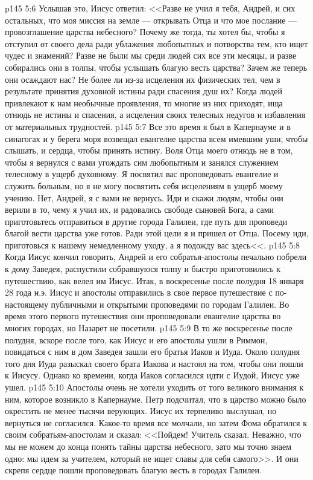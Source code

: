 \vs p145 5:6 Услышав это, Иисус ответил: <<Разве не учил я тебя, Андрей, и сих остальных, что моя миссия на земле --- открывать Отца и что мое послание --- провозглашение царства небесного? Почему же тогда, ты хотел бы, чтобы я отступил от своего дела ради ублажения любопытных и потворства тем, кто ищет чудес и знамений? Разве не были мы среди людей сих все эти месяцы, и разве собирались они в толпы, чтобы услышать благую весть царства? Зачем же теперь они осаждают нас? Не более ли из\hyp{}за исцеления их физических тел, чем в результате принятия духовной истины ради спасения душ их? Когда людей привлекают к нам необычные проявления, то многие из них приходят, ища отнюдь не истины и спасения, а исцеления своих телесных недугов и избавления от материальных трудностей.
\vs p145 5:7 Все это время я был в Капернауме и в синагогах и у берега моря возвещал евангелие царства всем имевшим уши, чтобы слышать, и сердца, чтобы принять истину. Воля Отца моего отнюдь не в том, чтобы я вернулся с вами угождать сим любопытным и занялся служением телесному в ущерб духовному. Я посвятил вас проповедовать евангелие и служить больным, но я не могу посвятить себя исцелениям в ущерб моему учению. Нет, Андрей, я с вами не вернусь. Иди и скажи людям, чтобы они верили в то, чему я учил их, и радовались свободе сыновей Бога, а сами приготовьтесь отправиться в другие города Галилеи, где путь для проповеди благой вести царства уже готов. Ради этой цели я и пришел от Отца. Посему иди, приготовься к нашему немедленному уходу, а я подожду вас здесь<<.
\vs p145 5:8 Когда Иисус кончил говорить, Андрей и его собратья\hyp{}апостолы печально побрели к дому Заведея, распустили собравшуюся толпу и быстро приготовились к путешествию, как велел им Иисус. Итак, в воскресенье после полудня 18 января 28 года н.э. Иисус и апостолы отправились в свое первое путешествие с по\hyp{}настоящему публичными и открытыми проповедями по городам Галилеи. Во время этого первого путешествия они проповедовали евангелие царства во многих городах, но Назарет не посетили.
\vs p145 5:9 В то же воскресенье после полудня, вскоре после того, как Иисус и его апостолы ушли в Риммон, повидаться с ним в дом Заведея зашли его братья Иаков и Иуда. Около полудня того дня Иуда разыскал своего брата Иакова и настоял на том, чтобы они пошли к Иисусу. Однако ко времени, когда Иаков согласился идти с Иудой, Иисус уже ушел.
\vs p145 5:10 Апостолы очень не хотели уходить от того великого внимания к ним, которое возникло в Капернауме. Петр подсчитал, что в царство можно было окрестить не менее тысячи верующих. Иисус их терпеливо выслушал, но вернуться не согласился. Какое\hyp{}то время все молчали, но затем Фома обратился к своим собратьям\hyp{}апостолам и сказал: <<Пойдем! Учитель сказал. Неважно, что мы не можем до конца понять тайны царства небесного, зато мы точно знаем одно: мы идем за учителем, который не ищет славы для себя самого>>. И они скрепя сердце пошли проповедовать благую весть в городах Галилеи.

